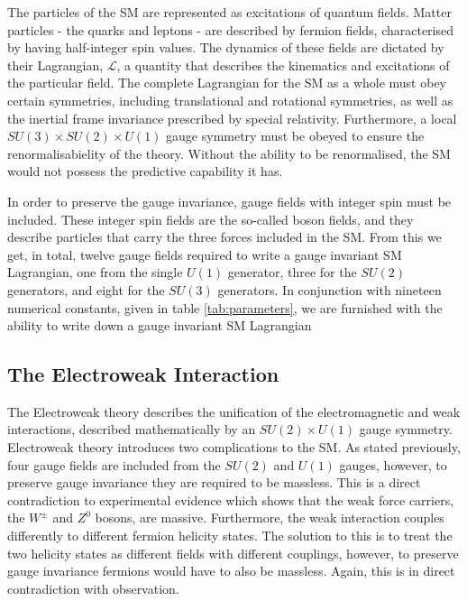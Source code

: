 The particles of the SM are represented as excitations of quantum fields.
Matter particles - the quarks and leptons - are described by fermion fields, characterised by having half-integer spin values.
The dynamics of these fields are dictated by their Lagrangian, $\mathcal{L}$, a quantity that describes the kinematics and excitations of the particular field. 
The complete Lagrangian for the SM as a whole must obey certain symmetries, including translational and rotational symmetries, as well as the inertial frame invariance prescribed by special relativity.
Furthermore, a local $SU(3) \times SU(2) \times U(1)$ gauge symmetry must be obeyed to ensure the renormalisabielity of the theory. 
Without the ability to be renormalised, the SM would not possess the predictive capability it has.

In order to preserve the gauge invariance, gauge fields with integer spin must be included.
These integer spin fields are the so-called boson fields, and they describe particles that carry the three forces included in the SM.
From this we get, in total, twelve gauge fields required to write a gauge invariant SM Lagrangian, one from the single $U(1)$ generator, three for the $SU(2)$ generators, and eight for the $SU(3)$ generators.
In conjunction with nineteen numerical constants, given in table \ref{tab:parameters}, we are furnished with the ability to write down a gauge invariant SM Lagrangian

\subsection{The Electroweak Interaction}
\label{subsec:EWInteraction}
The Electroweak theory \cite{glashow1959renormalizability} describes the unification of the electromagnetic and weak interactions, described mathematically by an $SU(2) \times U(1)$ gauge symmetry.
Electroweak theory introduces two complications to the SM.
As stated previously, four gauge fields are included from the $SU(2)$ and $U(1)$ gauges, however, to preserve gauge invariance they are required to be massless.
This is a direct contradiction to experimental evidence which shows that the weak force carriers, the $W^{\pm}$ and $Z^{0}$ bosons, are massive.
Furthermore, the weak interaction couples differently to different fermion helicity states.
The solution to this is to treat the two helicity states as different fields with different couplings, however, to preserve gauge invariance fermions would have to also be massless.
Again, this is in direct contradiction with observation.

